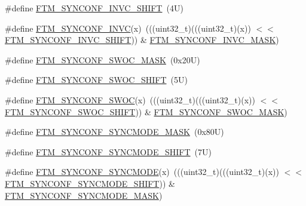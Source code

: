 \begin{DoxyCompactItemize}
\item 
\#define \mbox{\hyperlink{group___f_t_m___register___masks_ga3cd40ba39f488383a2fb0f456182fd69}{F\+T\+M\+\_\+\+S\+Y\+N\+C\+O\+N\+F\+\_\+\+I\+N\+V\+C\+\_\+\+S\+H\+I\+FT}}~(4\+U)
\item 
\#define \mbox{\hyperlink{group___f_t_m___register___masks_gae3ea15079b2f1791e82bacac36d01ee4}{F\+T\+M\+\_\+\+S\+Y\+N\+C\+O\+N\+F\+\_\+\+I\+N\+VC}}(x)~(((uint32\+\_\+t)(((uint32\+\_\+t)(x)) $<$$<$ \mbox{\hyperlink{group___f_t_m___register___masks_ga3cd40ba39f488383a2fb0f456182fd69}{F\+T\+M\+\_\+\+S\+Y\+N\+C\+O\+N\+F\+\_\+\+I\+N\+V\+C\+\_\+\+S\+H\+I\+FT}})) \& \mbox{\hyperlink{group___f_t_m___register___masks_ga64738e805ee6dc280986acc586530f28}{F\+T\+M\+\_\+\+S\+Y\+N\+C\+O\+N\+F\+\_\+\+I\+N\+V\+C\+\_\+\+M\+A\+SK}})
\item 
\#define \mbox{\hyperlink{group___f_t_m___register___masks_ga4be17e62a2b566e56f1fb8e1b6277637}{F\+T\+M\+\_\+\+S\+Y\+N\+C\+O\+N\+F\+\_\+\+S\+W\+O\+C\+\_\+\+M\+A\+SK}}~(0x20\+U)
\item 
\#define \mbox{\hyperlink{group___f_t_m___register___masks_ga526c746783f0693a0a3ceb20e439ca26}{F\+T\+M\+\_\+\+S\+Y\+N\+C\+O\+N\+F\+\_\+\+S\+W\+O\+C\+\_\+\+S\+H\+I\+FT}}~(5\+U)
\item 
\#define \mbox{\hyperlink{group___f_t_m___register___masks_gad16f1278f09bcd20c1dcce9130fa120d}{F\+T\+M\+\_\+\+S\+Y\+N\+C\+O\+N\+F\+\_\+\+S\+W\+OC}}(x)~(((uint32\+\_\+t)(((uint32\+\_\+t)(x)) $<$$<$ \mbox{\hyperlink{group___f_t_m___register___masks_ga526c746783f0693a0a3ceb20e439ca26}{F\+T\+M\+\_\+\+S\+Y\+N\+C\+O\+N\+F\+\_\+\+S\+W\+O\+C\+\_\+\+S\+H\+I\+FT}})) \& \mbox{\hyperlink{group___f_t_m___register___masks_ga4be17e62a2b566e56f1fb8e1b6277637}{F\+T\+M\+\_\+\+S\+Y\+N\+C\+O\+N\+F\+\_\+\+S\+W\+O\+C\+\_\+\+M\+A\+SK}})
\item 
\#define \mbox{\hyperlink{group___f_t_m___register___masks_ga89a0f9556ea7950d3e283bebb64ab41a}{F\+T\+M\+\_\+\+S\+Y\+N\+C\+O\+N\+F\+\_\+\+S\+Y\+N\+C\+M\+O\+D\+E\+\_\+\+M\+A\+SK}}~(0x80\+U)
\item 
\#define \mbox{\hyperlink{group___f_t_m___register___masks_gaa8a4896f4e71a168309874a5523cadfc}{F\+T\+M\+\_\+\+S\+Y\+N\+C\+O\+N\+F\+\_\+\+S\+Y\+N\+C\+M\+O\+D\+E\+\_\+\+S\+H\+I\+FT}}~(7\+U)
\item 
\#define \mbox{\hyperlink{group___f_t_m___register___masks_ga4df4d5eabdad09a823397bfac6aa3ce9}{F\+T\+M\+\_\+\+S\+Y\+N\+C\+O\+N\+F\+\_\+\+S\+Y\+N\+C\+M\+O\+DE}}(x)~(((uint32\+\_\+t)(((uint32\+\_\+t)(x)) $<$$<$ \mbox{\hyperlink{group___f_t_m___register___masks_gaa8a4896f4e71a168309874a5523cadfc}{F\+T\+M\+\_\+\+S\+Y\+N\+C\+O\+N\+F\+\_\+\+S\+Y\+N\+C\+M\+O\+D\+E\+\_\+\+S\+H\+I\+FT}})) \& \mbox{\hyperlink{group___f_t_m___register___masks_ga89a0f9556ea7950d3e283bebb64ab41a}{F\+T\+M\+\_\+\+S\+Y\+N\+C\+O\+N\+F\+\_\+\+S\+Y\+N\+C\+M\+O\+D\+E\+\_\+\+M\+A\+SK}})
$$
\end{DoxyCompactItemize}
